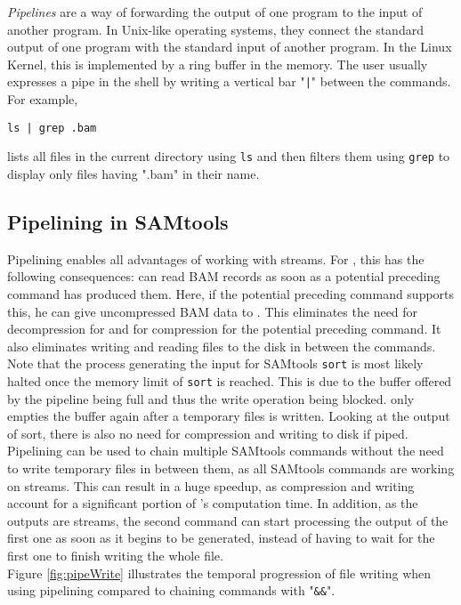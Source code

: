 \textit{Pipelines} are a way of forwarding the output of one program to the input of another program. In Unix-like operating systems, they connect the standard output of one program with the standard input of another program. In the Linux Kernel, this is implemented \cite{noauthor_linuxfspipec_nodate} by a ring buffer in the memory. The user usually expresses a pipe in the shell by writing a vertical bar "\texttt{|}" between the commands. For example, 
\begin{verbatim} 
ls | grep .bam 
\end{verbatim}
lists all files in the current directory using \texttt{ls} and then filters them using \texttt{grep} to display only files having ".bam" in their name. 

\subsection{Pipelining in SAMtools}
Pipelining enables all advantages of working with streams. For \sort, this has the following consequences: \sort can read BAM records as soon as a potential preceding command has produced them. Here, if the potential preceding command supports this, he can give uncompressed BAM data to \sort. This eliminates the need for decompression for \sort and for compression for the potential preceding command. It also eliminates writing and reading files to the disk in between the commands. Note that the process generating the input for SAMtools \texttt{sort} is most likely halted once the memory limit of \texttt{sort} is reached. This is due to the buffer offered by the pipeline being full and thus the write operation being blocked. \sort only empties the buffer again after a temporary files is written. Looking at the output of sort, there is also no need for compression and writing to disk if piped. \\
Pipelining can be used to chain multiple SAMtools commands without the need to write temporary files in between them, as all SAMtools commands are working on streams. This can result in a huge speedup, as compression and writing account for a significant portion of \sort's computation time. In addition, as the outputs are streams, the second command can start processing the output of the first one as soon as it begins to be generated, instead of having to wait for the first one to finish writing the whole file. \\
Figure \ref{fig:pipeWrite} illustrates the temporal progression of file writing when using pipelining compared to chaining commands with "\texttt{\&\&}".
